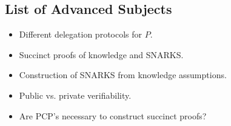 \documentclass{article}
\begin{document}
\subsection{List of Advanced Subjects}
\begin{itemize}
\item
Different delegation protocols for $P$.
\item
Succinct proofs of knowledge and SNARKS.
\item
Construction of SNARKS from knowledge assumptions.
\item
Public vs. private verifiability.
\item
Are PCP's necessary to construct succinct proofs?
\end{itemize}


\end{document}
